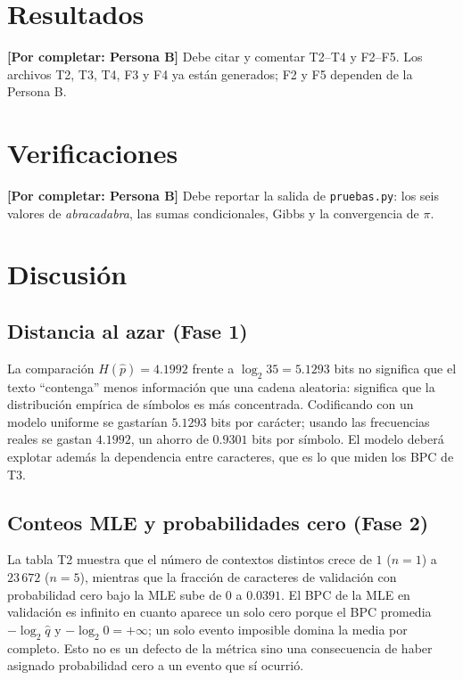 \documentclass[11pt,letterpaper]{article}
\begin{document}
\section{Resultados}

\textbf{[Por completar: Persona B]} Debe citar y comentar T2--T4 y F2--F5.
Los archivos T2, T3, T4, F3 y F4 ya están generados; F2 y F5 dependen de la
Persona B.

\section{Verificaciones}

\textbf{[Por completar: Persona B]} Debe reportar la salida de
\texttt{pruebas.py}: los seis valores de \emph{abracadabra}, las sumas
condicionales, Gibbs y la convergencia de $\pi$.

\section{Discusión}

\subsection{Distancia al azar (Fase 1)}

La comparación $H(\hat p)=4.1992$ frente a $\log_2 35=5.1293$ bits no significa
que el texto ``contenga'' menos información que una cadena aleatoria: significa
que la distribución empírica de símbolos es más concentrada. Codificando con un
modelo uniforme se gastarían $5.1293$ bits por carácter; usando las frecuencias
reales se gastan $4.1992$, un ahorro de $0.9301$ bits por símbolo. El modelo
deberá explotar además la dependencia entre caracteres, que es lo que miden los
BPC de T3.

\subsection{Conteos MLE y probabilidades cero (Fase 2)}

La tabla T2 muestra que el número de contextos distintos crece de $1$ ($n=1$) a
$23\,672$ ($n=5$), mientras que la fracción de caracteres de validación con
probabilidad cero bajo la MLE sube de $0$ a $0.0391$. El BPC de la MLE en
validación es infinito en cuanto aparece un solo cero porque el BPC promedia
$-\log_2\hat q$ y $-\log_2 0=+\infty$; un solo evento imposible domina la media
por completo. Esto no es un defecto de la métrica sino una consecuencia de
haber asignado probabilidad cero a un evento que sí ocurrió.
\end{document}
